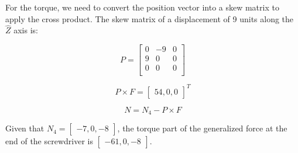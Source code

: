 \documentclass{exam}
\begin{document}
\begin{questions}
\begin{parts}
For the torque, we need to convert the position vector into a skew matrix to apply the cross product. The skew matrix of a displacement of 9 units along the $\hat Z$ axis is:

\begin{equation}
  P = \begin{bmatrix}
    0 & -9 & 0 \\
    9 & 0  & 0 \\
    0 & 0  & 0 \\
      \end{bmatrix}
\end{equation}

\begin{equation}
  P \times F = \begin{bmatrix}54, 0, 0\end{bmatrix}^T  
\end{equation}

\begin{equation}
  N = N_{4} - P \times F
\end{equation}

Given that $N_{4} = \begin{bmatrix}-7, 0, -8\end{bmatrix}$, the torque part of the generalized force at the end of the screwdriver is $\begin{bmatrix}-61, 0, -8\end{bmatrix}$.

\end{parts}

\question

\end{questions}
\end{document}
